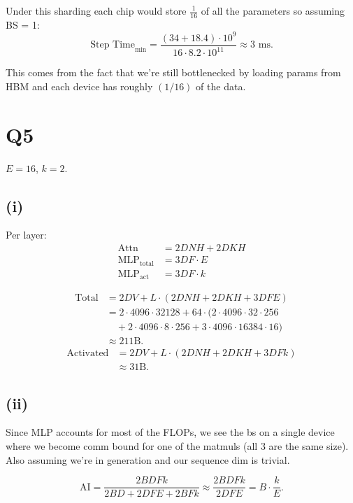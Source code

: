 \documentclass[11pt]{article}
\begin{document}
Under this sharding each chip would store $\frac{1}{16}$ of all the parameters so assuming BS = 1:
\[
\text{Step Time}_{\min} = \frac{(34 + 18.4) \cdot 10^9}{16 \cdot 8.2 \cdot 10^{11}} \approx 3 \text{ ms}.
\]

This comes from the fact that we're still bottlenecked by loading params from HBM and each device has roughly $(1/16)$ of the data.

\section*{Q5}

$E = 16$, $k = 2$.

\subsection*{(i)}

Per layer:
\begin{align*}
\text{Attn} &= 2DNH + 2DKH \\
\text{MLP}_{\text{total}} &= 3DF \cdot E \\
\text{MLP}_{\text{act}} &= 3DF \cdot k
\end{align*}

\begin{align*}
\text{Total} &= 2DV + L \cdot (2DNH + 2DKH + 3DFE) \\
&= 2 \cdot 4096 \cdot 32128 + 64 \cdot (2 \cdot 4096 \cdot 32 \cdot 256 \\
&\quad + 2 \cdot 4096 \cdot 8 \cdot 256 + 3 \cdot 4096 \cdot 16384 \cdot 16) \\
&\approx 211\text{B}.
\end{align*}
\begin{align*}
\text{Activated} &= 2DV + L \cdot (2DNH + 2DKH + 3DFk) \\
&\approx 31\text{B}.
\end{align*}

\subsection*{(ii)}

Since MLP accounts for most of the FLOPs, we see the bs on a single device where we become comm bound for one of the matmuls (all 3 are the same size). Also assuming we're in generation and our sequence dim is trivial.

\[
\text{AI} = \frac{2BDFk}{2BD + 2DFE + 2BFk} \approx \frac{2BDFk}{2DFE} = B \cdot \frac{k}{E}.
\]
\end{document}
